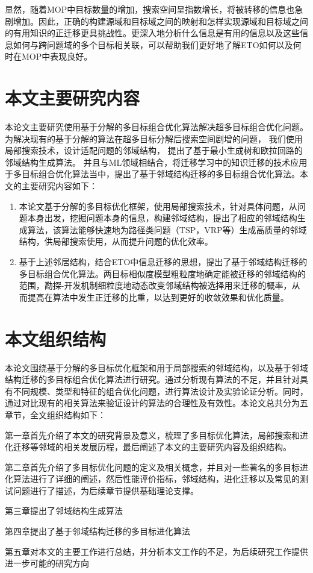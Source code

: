 显然，随着MOP中目标数量的增加，搜索空间呈指数增长，将被转移的信息也急剧增加\cite{tan2021evolutionary}。因此，正确的构建源域和目标域之间的映射和怎样实现源域和目标域之间的有用知识的正迁移更具挑战性。更深入地分析什么信息是有用的信息以及这些信息如何与跨问题域的多个目标相关联，可以帮助我们更好地了解ETO如何以及何时在MOP中表现良好。

\section{本文主要研究内容}

本论文主要研究使用基于分解的多目标组合优化算法解决超多目标组合优化问题。
为解决现有的基于分解的算法在超多目标分解后搜索空间剧增的问题，
我们使用局部搜索技术，设计适配问题的邻域结构，
提出了基于最小生成树和欧拉回路的邻域结构生成算法。
并且与ML领域相结合，将迁移学习中的知识迁移的技术应用于多目标组合优化算法当中，提出了基于邻域结构迁移的多目标组合优化算法。本文的主要研究内容如下：

\begin{enumerate}
    \item 本论文基于分解的多目标优化框架，使用局部搜索技术，针对具体问题，从问题本身出发，挖掘问题本身的信息，构建邻域结构，提出了相应的邻域结构生成算法，该算法能够快速地为路径类问题（TSP，VRP等）生成高质量的邻域结构，供局部搜索使用，从而提升问题的优化效率。
    \item 基于上述邻居结构，结合ETO中信息迁移的思想，提出了基于邻域结构迁移的多目标组合优化算法。两目标相似度模型粗粒度地确定能被迁移的邻域结构的范围，勘探-开发机制细粒度地动态改变邻域结构被选择用来迁移的概率，从而提高在算法中发生正迁移的比重，以达到更好的收敛效果和优化质量。
\end{enumerate}

\section{本文组织结构}

本论文围绕基于分解的多目标优化框架和用于局部搜索的邻域结构，以及基于邻域结构迁移的多目标组合优化算法进行研究。通过分析现有算法的不足，并且针对具有不同规模、类型和特征的组合优化问题，进行算法设计及实验论证分析。同时，通过对比现有的相关算法来验证设计的算法的合理性及有效性。本论文总共分为五章节，全文组织结构如下：

第一章首先介绍了本文的研究背景及意义，梳理了多目标优化算法，局部搜索和进化迁移等邻域的相关发展历程，最后阐述了本文的主要研究内容及组织结构。

第二章首先介绍了多目标优化问题的定义及相关概念，并且对一些著名的多目标进化算法进行了详细的阐述，然后性能评价指标，邻域结构，进化迁移以及常见的测试问题进行了描述，为后续章节提供基础理论支撑。

第三章提出了邻域结构生成算法

第四章提出了基于邻域结构迁移的多目标进化算法

第五章对本文的主要工作进行总结，并分析本文工作的不足，为后续研究工作提供进一步可能的研究方向